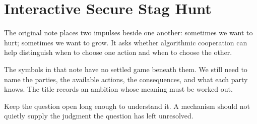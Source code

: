 \chapter{Interactive Secure Stag Hunt}
\label{short:stag-hunt}

The original note places two impulses beside one another: sometimes we want
to hurt; sometimes we want to grow. It asks whether algorithmic cooperation
can help distinguish when to choose one action and when to choose the other.

The symbols in that note have no settled game beneath them. We still need
to name the parties, the available actions, the consequences, and what each
party knows. The title records an ambition whose meaning must be worked out.

Keep the question open long enough to understand it. A mechanism should not
quietly supply the judgment the question has left unresolved.

